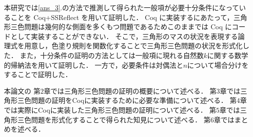 本研究では\ref{ans_3}.の方法で推測して得られた一般項が必要十分条件になっていることを Coq+SSReflect を用いて証明した．
Coq に実装するにあたって，三角形三色問題は幾何的な側面を多くもつ問題であるためこのままでは Coq にコードとして実装することができない．
そこで，三角形のマスの状況を表現する論理式を用意し，色塗り規則を関数化することで三角形三色問題の状況を形式化した．
また，十分条件の証明の方法としては一般項に現れる自然数$k$に関する数学的帰納法を用いて証明した．
一方で，必要条件は対偶法と$n$について場合分けをすることで証明した．

本論文の
第$2$章では三角形三色問題の証明の概要について述べる．
第$3$章では三角形三色問題の証明をCoqに実装するために必要な準備について述べる．
第$4$章では実際にCoqに実装した三角形三色問題の証明について述べる．
第$5$章では三角形三色問題を形式化することで得られた知見について述べる．
第$6$章ではまとめを述べる．
